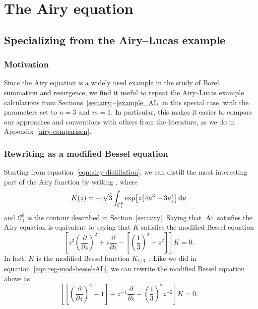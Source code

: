 \documentclass[10pt,a4paper]{amsart}
\DeclareMathOperator{\Ai}{Ai}
\numberwithin{equation}{section}
\begin{document}
\appendix

\section{The Airy equation}\label{airy-appendix}
\subsection{Specializing from the Airy--Lucas example}\label{sec:spec-to-airy}
\subsubsection{Motivation}
Since the Airy equation is a widely used example in the study of Borel summation and resurgence, we find it useful to repeat the Airy--Lucas example calculations from Sections~\ref{sec:airy}--\ref{example_AL} in this special case, with the parameters set to $n = 3$ and $m = 1$. In particular, this makes it easier to compare our approaches and conventions with others from the literature, as we do in Appendix~\ref{airy-comparison}.

\subsubsection{Rewriting as a modified Bessel equation}
Starting from equation~\eqref{eqn:airy-distillation}, we can distill the most interesting part of the Airy function by writing
\smash{$\Ai(y) = -\frac{1}{\pi\sqrt{3}} y^{1/2} K\big(\frac{2}{3} y^{3/2}\big)$},
where
\begin{equation}\label{integral:mod-bessel-airy}
K(z) = -{\rm i}\sqrt{3} \int_{\mathcal{C}^\theta_1} \exp\bigl[z \bigl(4u^3 - 3u\bigr)\bigr]\, {\rm d}u
\end{equation}
and $\mathcal{C}^\theta_1$ is the contour described in Section~\ref{sec:airy}. Saying that $\Ai$ satisfies the Airy equation is equivalent to saying that $K$ satisfies the modified Bessel equation
\[%
\left[z^2 \left(\frac{\partial}{\partial z}\right)^2 + z \frac{\partial}{\partial z} - \left[\left(\frac{1}{3}\right)^2 + z^2\right]\right] K = 0.
\]
In fact, $K$ is the modified Bessel function $K_{1/3}$~\cite[equation~(9.6.1)]{dlmf}. Like we did in equation~\eqref{eqn:reg-mod-bessel-AL}, we can rewrite the modified Bessel equation above as
\begin{equation}\label{eqn:reg-mod-bessel}
\left[ \left[ \left(\frac{\partial}{\partial z}\right)^2 - 1 \right] + z^{-1} \frac{\partial}{\partial z} - \left(\frac{1}{3}\right)^2 z^{-2} \right] K = 0.
\end{equation}
%
\end{document}
